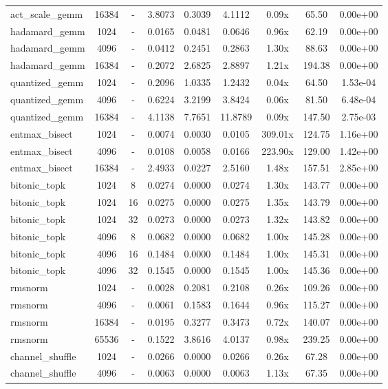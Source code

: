 \documentclass[journal]{IEEEtran}
\begin{document}
\begin{table}[t]
\begin{tabular}{lcccccccc}
act\_scale\_gemm & 16384 & - & 3.8073 & 0.3039 & 4.1112 & 0.09x & 65.50 & 0.00e+00 \\
hadamard\_gemm & 1024 & - & 0.0165 & 0.0481 & 0.0646 & 0.96x & 62.19 & 0.00e+00 \\
hadamard\_gemm & 4096 & - & 0.0412 & 0.2451 & 0.2863 & 1.30x & 88.63 & 0.00e+00 \\
hadamard\_gemm & 16384 & - & 0.2072 & 2.6825 & 2.8897 & 1.21x & 194.38 & 0.00e+00 \\
quantized\_gemm & 1024 & - & 0.2096 & 1.0335 & 1.2432 & 0.04x & 64.50 & 1.53e-04 \\
quantized\_gemm & 4096 & - & 0.6224 & 3.2199 & 3.8424 & 0.06x & 81.50 & 6.48e-04 \\
quantized\_gemm & 16384 & - & 4.1138 & 7.7651 & 11.8789 & 0.09x & 147.50 & 2.75e-03 \\
entmax\_bisect & 1024 & - & 0.0074 & 0.0030 & 0.0105 & 309.01x & 124.75 & 1.16e+00 \\
entmax\_bisect & 4096 & - & 0.0108 & 0.0058 & 0.0166 & 223.90x & 129.00 & 1.42e+00 \\
entmax\_bisect & 16384 & - & 2.4933 & 0.0227 & 2.5160 & 1.48x & 157.51 & 2.85e+00 \\
bitonic\_topk & 1024 & 8 & 0.0274 & 0.0000 & 0.0274 & 1.30x & 143.77 & 0.00e+00 \\
bitonic\_topk & 1024 & 16 & 0.0275 & 0.0000 & 0.0275 & 1.35x & 143.79 & 0.00e+00 \\
bitonic\_topk & 1024 & 32 & 0.0273 & 0.0000 & 0.0273 & 1.32x & 143.82 & 0.00e+00 \\
bitonic\_topk & 4096 & 8 & 0.0682 & 0.0000 & 0.0682 & 1.00x & 145.28 & 0.00e+00 \\
bitonic\_topk & 4096 & 16 & 0.1484 & 0.0000 & 0.1484 & 1.00x & 145.31 & 0.00e+00 \\
bitonic\_topk & 4096 & 32 & 0.1545 & 0.0000 & 0.1545 & 1.00x & 145.36 & 0.00e+00 \\
rmsnorm & 1024 & - & 0.0028 & 0.2081 & 0.2108 & 0.26x & 109.26 & 0.00e+00 \\
rmsnorm & 4096 & - & 0.0061 & 0.1583 & 0.1644 & 0.96x & 115.27 & 0.00e+00 \\
rmsnorm & 16384 & - & 0.0195 & 0.3277 & 0.3473 & 0.72x & 140.07 & 0.00e+00 \\
rmsnorm & 65536 & - & 0.1522 & 3.8616 & 4.0137 & 0.98x & 239.25 & 0.00e+00 \\
channel\_shuffle & 1024 & - & 0.0266 & 0.0000 & 0.0266 & 0.26x & 67.28 & 0.00e+00 \\
channel\_shuffle & 4096 & - & 0.0063 & 0.0000 & 0.0063 & 1.13x & 67.35 & 0.00e+00 \\

\end{tabular}
\end{table}
\end{document}
